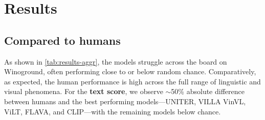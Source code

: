 \documentclass[10pt,twocolumn,letterpaper]{article}
\begin{document}
\section{Results}\label{sec:results}

\subsection{Compared to humans}
As shown in \cref{tab:results-aggr}, the models struggle across the board on Winoground, often performing close to or below random chance. Comparatively, as expected, the human performance is high across the full range of linguistic and visual phenomena.
For the \textbf{text score}, we observe $\sim$50\% absolute difference between humans and the best performing models---UNITER, VILLA VinVL, ViLT, FLAVA, and CLIP---with the remaining models below chance.
\end{document}
